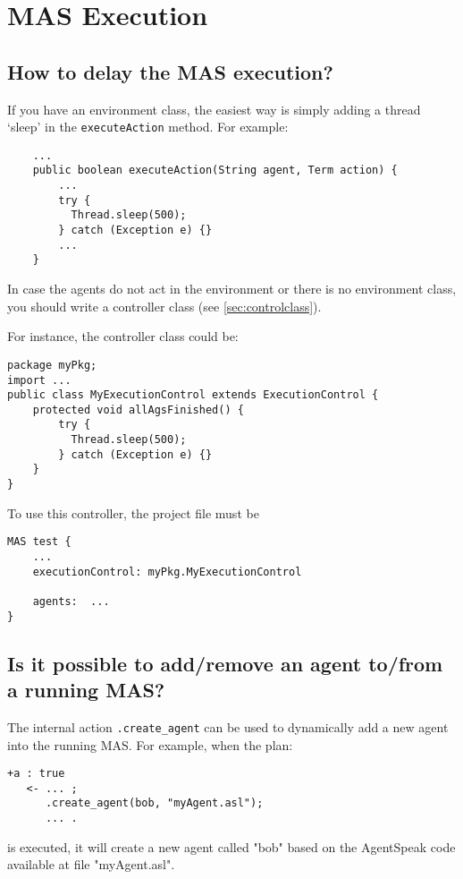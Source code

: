 \documentclass{article}
\newcommand{\code}[1]{\texttt{#1}}
\begin{document}
\section{MAS Execution}

\subsection{How to delay the MAS execution?}

If you have an environment class, the easiest way is simply adding a
thread `sleep' in the \code{executeAction} method. For example:
\begin{verbatim}
    ...
    public boolean executeAction(String agent, Term action) {
        ...
        try { 
          Thread.sleep(500); 
        } catch (Exception e) {}
        ...
    }
\end{verbatim}

In case the agents do not act in the environment or there is no
environment class, you should write a controller class (see
\ref{sec:controlclass}).

For instance, the controller class could be:
\begin{verbatim}
package myPkg;
import ...
public class MyExecutionControl extends ExecutionControl {
    protected void allAgsFinished() {
        try { 
          Thread.sleep(500); 
        } catch (Exception e) {}
    }
}
\end{verbatim}

To use this controller, the project file must be
\begin{verbatim}
MAS test {
    ...
    executionControl: myPkg.MyExecutionControl

    agents:  ...
}
\end{verbatim}

\subsection{Is it possible to add/remove an agent to/from a running MAS?}

The internal action \code{.create_agent} can be used to dynamically
add a new agent into the running MAS. For example, when the plan:
\begin{verbatim}
+a : true 
   <- ... ; 
      .create_agent(bob, "myAgent.asl");
      ... .
\end{verbatim}
is executed, it will create a new agent called "bob" based on the
AgentSpeak code available at file "myAgent.asl".
\end{document}
